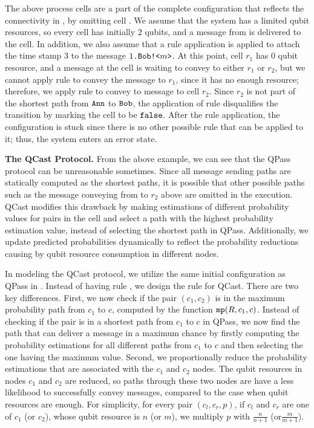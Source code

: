 The above process cells are a part of the complete configuration that reflects the connectivity in , by omitting cell .
We assume that the system has a limited qubit resources, so every cell has initially $2$ qubits,
and a message from  is delivered to the  cell. In addition, we also assume that a  rule application is applied to attach the time stamp $3$ to the message $1\texttt{.}\texttt{Bob}\texttt{!<}m\texttt{>}$. 
At this point, cell $r_1$ has $0$ qubit resource, and a message at the  cell is waiting to convey to either $r_1$ or $r_2$,
but we cannot apply rule  to convey the message to $r_1$, since it has no enough resource; therefore, we apply rule  to convey to message to cell $r_2$.
Since $r_2$ is not part of the shortest path from $\texttt{Ann}$ to $\texttt{Bob}$, the application of rule  disqualifies the transition by marking the  cell to be $\texttt{false}$.
After the  rule application, the configuration is stuck since there is no other possible rule that can be applied to it; thus, the system enters an error state.

\noindent\textbf{The QCast Protocol.}
From the above example, we can see that the QPass protocol can be unreasonable sometimes.
Since all message sending paths are statically computed as the shortest paths,
it is possible that other possible paths such as the message conveying from  to $r_2$ above are omitted in the execution.
QCast modifies this drawback by making estimations of different probability values for pairs in the  cell
and select a path with the highest probability estimation value, instead of selecting the shortest path in QPass.
Additionally, we update predicted probabilities dynamically to reflect the probability reductions causing by qubit resource
consumption in different nodes.

In modeling the QCast protocol, we utilize the same initial configuration as QPass in .
Instead of having rule , we design the  rule for QCast.
There are two key differences. First, we now check if the pair $(c_1,c_2)$ is in the maximum probability path from $c_1$ to $c$, computed by the function $\texttt{mp}(R,c_1,c)$. Instead of checking if the pair is in a shortest path from $c_1$ to $c$ in QPass, we now find the path that can deliver a message in a maximum chance by firstly computing the probability estimations for all different paths from $c_1$ to $c$ and then selecting the one having the maximum value. Second, we proportionally reduce the probability estimations that are associated with the $c_1$ and $c_2$ nodes. The qubit resources in nodes $c_1$ and $c_2$ are reduced, so paths through these two nodes are have a less likelihood to successfully convey messages, compared to the case when qubit resources are enough.
For simplicity, for every pair $(c_l,c_r,p)$, if $c_l$ and $c_r$ are one of $c_1$ (or $c_2$), whose qubit resource is $n$ (or $m$), we multiply $p$ with $\frac{n}{n+1}$ (or$ \frac{m}{m+1}$). 

